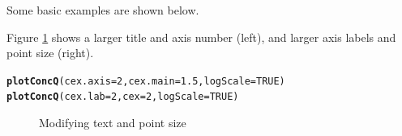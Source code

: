 \documentclass[a4paper,11pt]{article}\usepackage[]{graphicx}\usepackage[]{color}
\makeatletter
\newcommand{\hlnum}[1]{\textcolor[rgb]{0.686,0.059,0.569}{#1}}%
\newcommand{\hlstd}[1]{\textcolor[rgb]{0.345,0.345,0.345}{#1}}%
\newcommand{\hlkwc}[1]{\textcolor[rgb]{0.333,0.667,0.333}{#1}}%
\newcommand{\hlkwd}[1]{\textcolor[rgb]{0.737,0.353,0.396}{\textbf{#1}}}%
\newenvironment{kframe}{%
 \def\at@end@of@kframe{}%
 \ifinner\ifhmode%
  \def\at@end@of@kframe{\end{minipage}}%
  \begin{minipage}{\columnwidth}%
 \fi\fi%
 \def\FrameCommand##1{\hskip\@totalleftmargin \hskip-\fboxsep
 \colorbox{shadecolor}{##1}\hskip-\fboxsep
     \hskip-\linewidth \hskip-\@totalleftmargin \hskip\columnwidth}%
 \MakeFramed {\advance\hsize-\width
   \@totalleftmargin\z@ \linewidth\hsize
   \@setminipage}}%
 {\par\unskip\endMakeFramed%
 \at@end@of@kframe}
\newenvironment{knitrout}{}{} %
\makeatother
\begin{document}
Some basic examples are shown below.

Figure \ref{fig:adjustSize} shows a larger title and axis number (left), and larger axis labels and point size (right).
\begin{knitrout}
\color{fgcolor}\begin{kframe}
\begin{alltt}
\hlkwd{plotConcQ}\hlstd{(}\hlkwc{cex.axis}\hlstd{=}\hlnum{2}\hlstd{,}\hlkwc{cex.main}\hlstd{=}\hlnum{1.5}\hlstd{,}\hlkwc{logScale}\hlstd{=}\hlnum{TRUE}\hlstd{)}
\hlkwd{plotConcQ}\hlstd{(}\hlkwc{cex.lab}\hlstd{=}\hlnum{2}\hlstd{,}\hlkwc{cex}\hlstd{=}\hlnum{2}\hlstd{,}\hlkwc{logScale}\hlstd{=}\hlnum{TRUE}\hlstd{)}
\end{alltt}
\end{kframe}\begin{figure}[]
\caption[Modifying text and point size]{Modifying text and point size\label{fig:adjustSize}}
\end{figure}


\end{knitrout}
\end{document}
